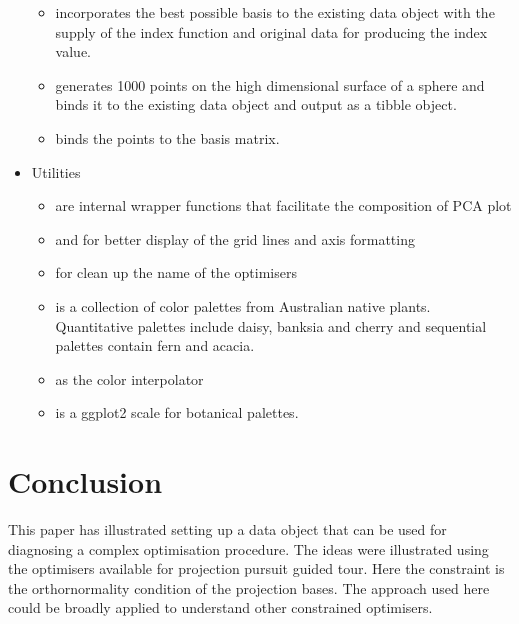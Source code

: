 \begin{itemize}
  \begin{itemize}
  \tightlist
  \item
     incorporates the best possible basis to
    the existing data object with the supply of the index function and
    original data for producing the index value.
  \item
     generates 1000 points on the high dimensional
    surface of a sphere and binds it to the existing data object and
    output as a tibble object.
  \item
     binds the points to the basis matrix.
  \end{itemize}
\item
  Utilities

  \begin{itemize}
  \tightlist
  \item
     are internal wrapper functions that facilitate the
    composition of PCA plot
  \item
     and  for better display
    of the grid lines and axis formatting
  \item
     for clean up the name of the optimisers
  \item
     is a collection of color palettes from
    Australian native plants. Quantitative palettes include daisy,
    banksia and cherry and sequential palettes contain fern and acacia.
  \item
     as the color interpolator
  \item
     is a ggplot2 scale for botanical
    palettes.
  \end{itemize}
\end{itemize}

\hypertarget{conclusion}{%
\section{Conclusion}\label{conclusion}}

This paper has illustrated setting up a data object that can be used for
diagnosing a complex optimisation procedure. The ideas were illustrated
using the optimisers available for projection pursuit guided tour. Here
the constraint is the orthornormality condition of the projection bases.
The approach used here could be broadly applied to understand other
constrained optimisers.

